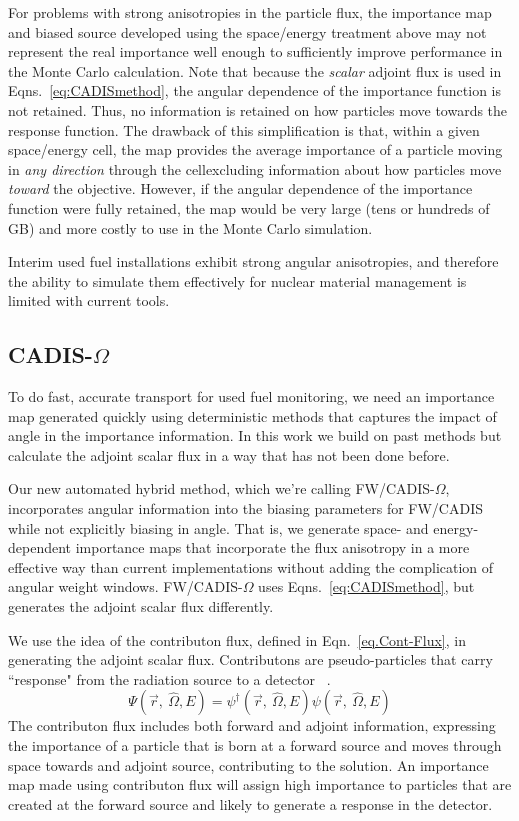 \documentclass[12pt]{article}
\begin{document}
For problems with strong anisotropies in the particle flux, the importance map and biased source developed using the space/energy treatment above may not represent the real importance well enough to sufficiently improve performance in the Monte Carlo calculation. 
Note that because the \textit{scalar} adjoint flux is used in Eqns.~\eqref{eq:CADISmethod}, the angular dependence of the importance function is not retained. 
Thus, no information is retained on how particles move towards the response function. 
The drawback of this simplification is that, within a given space/energy cell, the map provides the average importance of a particle moving in \textit{any direction} through the cell\textemdash excluding information about how particles move \textit{toward} the objective. 
However, if the angular dependence of the importance function were fully retained, the map would be very large (tens or hundreds of GB) and more costly to use in the Monte Carlo simulation. 

Interim used fuel installations exhibit strong angular anisotropies, and therefore the ability to simulate them effectively for nuclear material management is limited with current tools. 

\subsection{CADIS-$\Omega$}
To do fast, accurate transport for used fuel monitoring, we need an importance map generated quickly using deterministic methods that captures the impact of angle in the importance information. 
In this work we build on past methods but calculate the adjoint scalar flux in a way that has not been done before.

Our new automated hybrid method, which we're calling FW/CADIS-$\Omega$, incorporates angular information into the biasing parameters for FW/CADIS while not explicitly biasing in angle. 
That is, we generate space- and energy-dependent importance maps that incorporate the flux anisotropy in a more effective way than current implementations without adding the complication of angular weight windows. 
FW/CADIS-$\Omega$ uses Eqns.~\eqref{eq:CADISmethod}, but generates the adjoint scalar flux differently. 

We use the idea of the contributon flux, defined in Eqn.~\eqref{eq.Cont-Flux}, in generating the adjoint scalar flux. 
Contributons are pseudo-particles that carry ``response" from the radiation source to a detector ~\cite{williams_generalized_1991,williams_contributorn_1992,williams_contributon_study}. 
%
\begin{equation}
\Psi (\vec {r},\:\hat\Omega ,E) = \psi^{\dagger} (\vec {r},\:\hat\Omega ,E) \psi(\vec {r} ,\:\hat\Omega,E)
\label{eq.Cont-Flux} 
\end{equation}
%
The contributon flux includes both forward and adjoint information, expressing the importance of a particle that is born at a forward source and moves through space towards and adjoint source, contributing to the solution.
An importance map made using contributon flux will assign high importance to particles that are created at the forward source and likely to generate a response in the detector. 
\end{document}
